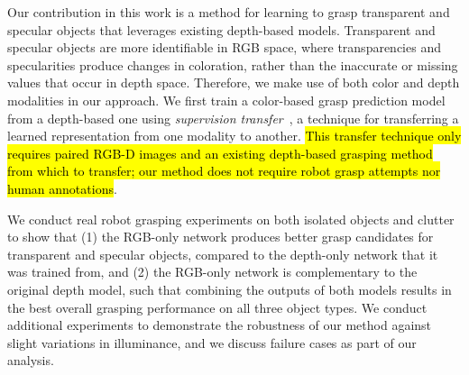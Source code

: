 Our contribution in this work is a method for learning to grasp transparent and specular objects that leverages existing depth-based models.
Transparent and specular objects are more identifiable in RGB space, where transparencies and specularities produce changes in coloration, rather than the inaccurate or missing values that occur in depth space.
Therefore, we make use of both color and depth modalities in our approach.
We first train a color-based grasp prediction model from a depth-based one using \textit{supervision transfer}~\cite{hoffman2016cross}, a technique for transferring a learned representation from one modality to another. 
\hl{This transfer technique only requires paired RGB-D images and an existing depth-based grasping method from which to transfer; our method does not require robot grasp attempts nor human annotations}. 

We conduct real robot grasping experiments on both isolated objects and clutter to show that (1) the RGB-only network produces better grasp candidates for transparent and specular objects, compared to the depth-only network that it was trained from, and (2) the RGB-only network is complementary to the original depth model, such that combining the outputs of both models results in the best overall grasping performance on all three object types. 
We conduct additional experiments to demonstrate the robustness of our method against slight variations in illuminance, and we discuss failure cases as part of our analysis.
